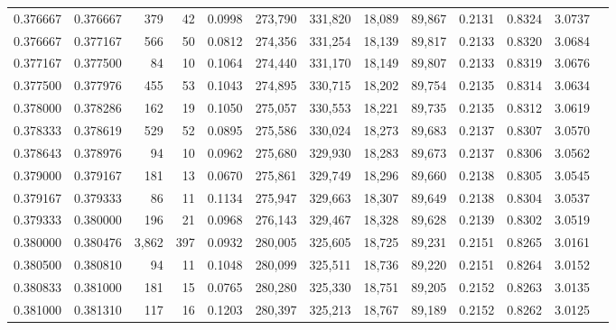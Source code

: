 \begin{tabular}{rrrrrrrrrrrrr}
0.376667 & 0.376667 &   379 &  42 &                                     0.0998 & 273,790 & 331,820 &  18,089 &  89,867 & 0.2131 & 0.8324 & 3.0737 \\
0.376667 & 0.377167 &   566 &  50 &                                     0.0812 & 274,356 & 331,254 &  18,139 &  89,817 & 0.2133 & 0.8320 & 3.0684 \\
0.377167 & 0.377500 &    84 &  10 &                                     0.1064 & 274,440 & 331,170 &  18,149 &  89,807 & 0.2133 & 0.8319 & 3.0676 \\
0.377500 & 0.377976 &   455 &  53 &                                     0.1043 & 274,895 & 330,715 &  18,202 &  89,754 & 0.2135 & 0.8314 & 3.0634 \\
0.378000 & 0.378286 &   162 &  19 &                                     0.1050 & 275,057 & 330,553 &  18,221 &  89,735 & 0.2135 & 0.8312 & 3.0619 \\
0.378333 & 0.378619 &   529 &  52 &                                     0.0895 & 275,586 & 330,024 &  18,273 &  89,683 & 0.2137 & 0.8307 & 3.0570 \\
0.378643 & 0.378976 &    94 &  10 &                                     0.0962 & 275,680 & 329,930 &  18,283 &  89,673 & 0.2137 & 0.8306 & 3.0562 \\
0.379000 & 0.379167 &   181 &  13 &                                     0.0670 & 275,861 & 329,749 &  18,296 &  89,660 & 0.2138 & 0.8305 & 3.0545 \\
0.379167 & 0.379333 &    86 &  11 &                                     0.1134 & 275,947 & 329,663 &  18,307 &  89,649 & 0.2138 & 0.8304 & 3.0537 \\
0.379333 & 0.380000 &   196 &  21 &                                     0.0968 & 276,143 & 329,467 &  18,328 &  89,628 & 0.2139 & 0.8302 & 3.0519 \\
0.380000 & 0.380476 & 3,862 & 397 &                                     0.0932 & 280,005 & 325,605 &  18,725 &  89,231 & 0.2151 & 0.8265 & 3.0161 \\
0.380500 & 0.380810 &    94 &  11 &                                     0.1048 & 280,099 & 325,511 &  18,736 &  89,220 & 0.2151 & 0.8264 & 3.0152 \\
0.380833 & 0.381000 &   181 &  15 &                                     0.0765 & 280,280 & 325,330 &  18,751 &  89,205 & 0.2152 & 0.8263 & 3.0135 \\
0.381000 & 0.381310 &   117 &  16 &                                     0.1203 & 280,397 & 325,213 &  18,767 &  89,189 & 0.2152 & 0.8262 & 3.0125 \\

\end{tabular}
